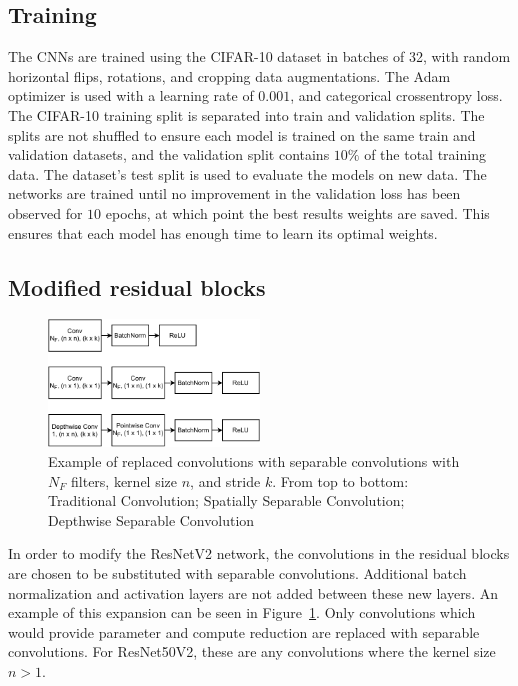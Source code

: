 \documentclass{article}
\begin{document}
	\subsection{Training}
	
	The CNNs are trained using the CIFAR-10 dataset \cite{cifar10} in batches of 32, with random horizontal flips, rotations, and cropping data augmentations. The Adam optimizer \cite{adam} is used with a learning rate of $0.001$, and categorical crossentropy loss. The CIFAR-10 training split is separated into train and validation splits. The splits are not shuffled to ensure each model is trained on the same train and validation datasets, and the validation split contains $10\%$ of the total training data. The dataset's test split is used to evaluate the models on new data. The networks are trained until no improvement in the validation loss has been observed for $10$ epochs, at which point the best results weights are saved. This ensures that each model has enough time to learn its optimal weights.
	
	\subsection{Modified residual blocks}
	
	\begin{figure}[t!]
		\centering
		\includegraphics[width=0.5\textwidth]{images/conv-structure.pdf}
		\caption{Example of replaced convolutions with separable convolutions with $N_F$ filters, kernel size $n$, and stride $k$. From top to bottom: Traditional Convolution; Spatially Separable Convolution; Depthwise Separable Convolution}
		\label{fig:conv-structure}
	\end{figure}
	
	In order to modify the ResNetV2 network, the convolutions in the residual blocks are chosen to be substituted with separable convolutions. Additional batch normalization and activation layers are not added between these new layers. An example of this expansion can be seen in Figure~\ref{fig:conv-structure}. Only convolutions which would provide parameter and compute reduction are replaced with separable convolutions. For ResNet50V2, these are any convolutions where the kernel size $n > 1$. 
	
\end{document}
